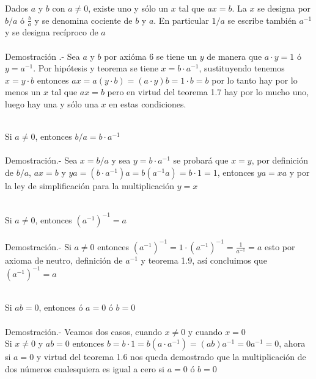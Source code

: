 \begin{enumerate}
\begin{teo} Dados $a$ y $b$ con $a\neq 0$, existe uno y sólo un $x$ tal que $ax=b$. La $x$ se designa por $b/a$ ó $\displaystyle\frac{b}{a}$ y se denomina cociente de $b$ y $a$. En particular $1/a$ se escribe también $a^{-1}$ y se designa recíproco de $a$\\\\
Demostración .- \;
Sea $a$ y $b$ por axióma 6 se tiene un $y$ de manera que $a\cdot y = 1$ ó $y = a^{-1}$. Por hipótesis y teorema se tiene $x=b\cdot a^{-1}$, sustituyendo tenemos $x=y\cdot b$ entonces $ax=a(y\cdot b)=(a\cdot y)b=1\cdot b = b$  por lo tanto hay por lo menos un $x$ tal que $ax=b$ pero en virtud del teorema 1.7 hay por lo mucho uno, luego hay una y sólo una $x$ en estas condiciones.\\\\ 
\end{teo}

\begin{teo}
Si $a\neq 0$, entonces $b/a=b\cdot a^{-1}$\\\\
Demostración.- \;
Sea $x =b/a$ y sea $y=b\cdot a^{-1}$ se probará que $x=y$, por definición de $b/a$, $ax=b$ y $ya=(b\cdot a^{-1})a=b(a^{-1}a)=b\cdot 1 = 1$, entonces $ya=xa$ y por la ley de simplificación para la multiplicación $y=x$ \\\\
\end{teo}

\begin{teo}
Si $a\neq 0$, entonces $(a^{-1})^{-1}=a$\\\\
Demostración.- \;
Si $a\neq 0$ entonces  $(a^{-1})^{-1} = 1\cdot (a^{-1})^{-1} = \displaystyle\frac{1}{a^{-1}}=a$ esto por axioma de neutro, definición de $a^{-1}$ y teorema 1.9, así concluimos que $(a^{-1})^{-1}=a $ \\\\
\end{teo}

\begin{teo}
Si $ab = 0$, entonces ó $a=0$ ó $b=0$\\\\
Demostración.- \;
Veamos dos casos, cuando $x\neq 0$ y cuando $x=0$\\
Si $x\neq 0$ y  $ab = 0$ entonces  $b=b\cdot 1 = b (a\cdot a^{-1}) = (ab)a^{-1}=0a^{-1}=0$, ahora si $a=0$ y virtud del teorema 1.6 nos queda demostrado que la multiplicación de dos números cualesquiera es igual a cero si $a=0$ ó $b=0$  \\\\
\end{teo}


\end{enumerate}

